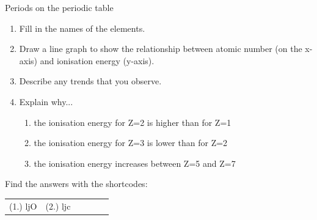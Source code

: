 \begin{exercises}{Periods on the periodic table}
\begin{enumerate}[noitemsep, label=\textbf{\arabic*}. ]
\begin{enumerate}[noitemsep, label=\textbf{\alph*}. ]
 \item Fill in the names of the elements.
\item Draw a line graph to show the relationship between atomic number (on the x-axis) and ionisation energy (y-axis).
\item Describe any trends that you observe.
\item Explain why...
	\begin{enumerate}[noitemsep, label=\textbf{\roman*}. ]
	\item{the ionisation energy for Z=2 is higher than for Z=1}
	\item{the ionisation energy for Z=3 is lower than for Z=2}
	\item{the ionisation energy increases between Z=5 and Z=7}
	\end{enumerate}

\end{enumerate}
\end{enumerate}
      \label{m38757*secfhsst!!!underscore!!!id936}
\par {} Find the answers with the shortcodes:
 \par \begin{tabular}[h]{cccccc}
 (1.) ljO  & (2.) ljc \end{tabular}
\end{exercises}
